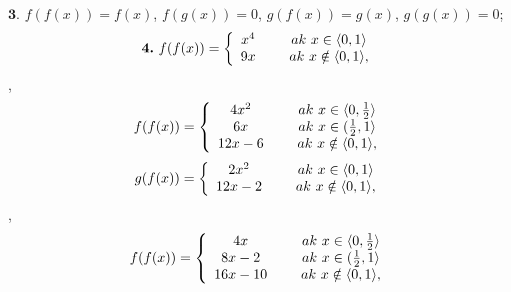 $\boldsymbol{3.}$
$ f(f(x)) = f(x) $, $ f(g(x)) = 0 $, $ g(f(x)) = g(x) $, $ g(g(x)) = 0 $;
\begin{align*} 
\boldsymbol{4.}\ f(f(x))= \left\{ \begin{array}{cc} 
                x^{4} & \hspace{5mm} ak\ x \in \langle0,1\rangle \\
                9x & \hspace{5mm} ak\ x \notin \langle0,1\rangle , \\
                \end{array} \right.
\end{align*}, 
\begin{align*} 
 f(f(x))= \left\{ \begin{array}{cc} 
                4x^{2} & \hspace{5mm} ak\ x \in \langle0, \frac{1}{2}\rangle \\
                6x & \hspace{5mm} ak\ x \in ( \frac{1}{2},1\rangle \\
                12x-6 & \hspace{5mm} ak\ x \notin \langle0,1\rangle , \\
                \end{array} \right.
\end{align*}
\begin{align*} 
g(f(x))= \left\{ \begin{array}{cc} 
                2x^{2} & \hspace{5mm} ak\ x \in \langle0,1\rangle \\
                12x-2 & \hspace{5mm} ak\ x \notin \langle0,1\rangle , \\
                \end{array} \right.
\end{align*}, 
\begin{align*} 
 f(f(x))= \left\{ \begin{array}{cc} 
                4x & \hspace{5mm} ak\ x \in \langle0, \frac{1}{2}\rangle \\
                8x-2 & \hspace{5mm} ak\ x \in ( \frac{1}{2},1\rangle \\
                16x-10 & \hspace{5mm} ak\ x \notin \langle0,1\rangle , \\
                \end{array} \right.
\end{align*}
